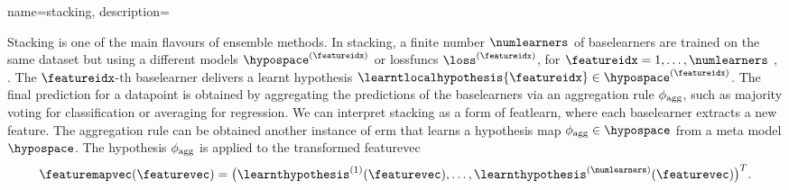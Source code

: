 {name={stacking}, 
	description={Stacking is one of the main flavours of \gls{ensemble} methods.  
		In stacking, a finite number $\numlearners$ of \glspl{baselearner} are trained on the 
		same \gls{dataset} but using a different \glspl{model} $\hypospace^{(\featureidx)}$ 
		or \glspl{lossfunc} $\loss^{(\featureidx)}$, for $\featureidx=1,\ldots,\numlearners$ \cite[Ch. 8.8]{hastie01statisticallearning},
		\cite{WOLPERT1992241,ZhouEnsemble2012}. 
		The $\featureidx$-th \gls{baselearner} delivers a learnt \gls{hypothesis} 
		$\learntlocalhypothesis{\featureidx} \in \hypospace^{(\featureidx)}$. 
		The final \gls{prediction} for a \gls{datapoint} is obtained by aggregating the 
		\glspl{prediction} of the \glspl{baselearner} via an aggregation rule $\phi_{\rm agg}$, 
		such as majority voting for \gls{classification} or averaging for \gls{regression}. 
		We can interpret stacking as a form of \gls{featlearn}, where each \gls{baselearner} 
		extracts a new \gls{feature}. The aggregation rule can be obtained another instance 
		of \gls{erm} that learns a \gls{hypothesis} map $\phi_{\rm agg} \in \hypospace$ from 
		a meta \gls{model} $\hypospace$. The \gls{hypothesis} $\phi_{\rm agg}$ is applied to the 
		transformed \gls{featurevec} $$\featuremapvec(\featurevec)= \big( \learnthypothesis^{(1)}(\featurevec), 
       \ldots, \learnthypothesis^{(\numlearners)}(\featurevec) \big)^{T}.$$
       \begin{figure}[htbp]
		\begin{center}
\end{center}
\end{figure}}}
